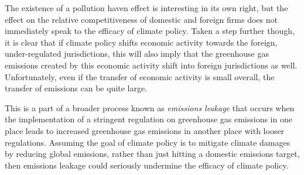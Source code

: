 The existence of a pollution haven effect is interesting in its own right, but the effect on the relative competitiveness of domestic and foreign firms does not immediately speak to the efficacy of climate policy. Taken a step further though, it is clear that if climate policy shifts economic activity towards the foreign, under-regulated jurisdictions, this will also imply that the greenhouse gas emissions created by this economic activity shift into foreign jurisdictions as well. Unfortunately, even if the transfer of economic activity is small overall, the transfer of emissions can be quite large.

This is a part of a broader process known as \emph{emissions leakage} that occurs when the implementation of a stringent regulation on greenhouse gas emissions in one place leads to increased greenhouse gas emissions in another place with looser regulations. Assuming the goal of climate policy is to mitigate climate damages by reducing global emissions, rather than just hitting a domestic emissions target, then emissions leakage could seriously undermine the efficacy of climate policy. 



